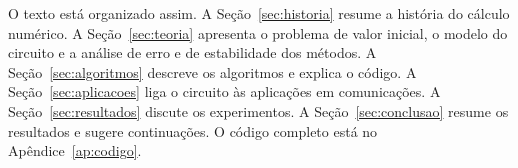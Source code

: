 O texto está organizado assim. A Seção~\ref{sec:historia} resume a história do cálculo numérico. A Seção~\ref{sec:teoria} apresenta o problema de valor inicial, o modelo do circuito e a análise de erro e de estabilidade dos métodos. A Seção~\ref{sec:algoritmos} descreve os algoritmos e explica o código. A Seção~\ref{sec:aplicacoes} liga o circuito às aplicações em comunicações. A Seção~\ref{sec:resultados} discute os experimentos. A Seção~\ref{sec:conclusao} resume os resultados e sugere continuações. O código completo está no Apêndice~\ref{ap:codigo}.
